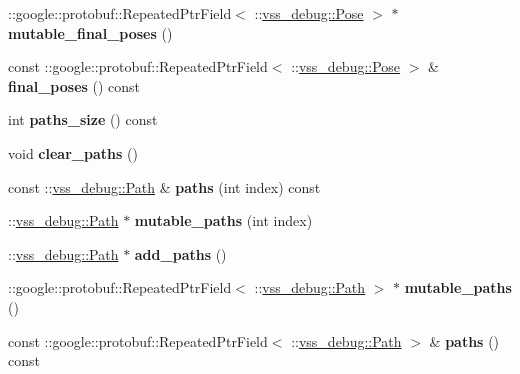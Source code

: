\begin{DoxyCompactItemize}
\item 
\+::google\+::protobuf\+::\+Repeated\+Ptr\+Field$<$ \+::\hyperlink{classvss__debug_1_1Pose}{vss\+\_\+debug\+::\+Pose} $>$ $\ast$ {\bfseries mutable\+\_\+final\+\_\+poses} ()\hypertarget{classvss__debug_1_1Global__Debug_a10edc59958966ab10a17de47665d197b}{}\label{classvss__debug_1_1Global__Debug_a10edc59958966ab10a17de47665d197b}

\item 
const \+::google\+::protobuf\+::\+Repeated\+Ptr\+Field$<$ \+::\hyperlink{classvss__debug_1_1Pose}{vss\+\_\+debug\+::\+Pose} $>$ \& {\bfseries final\+\_\+poses} () const \hypertarget{classvss__debug_1_1Global__Debug_aa6513cf1f4f95e6508b4b5d70858e40a}{}\label{classvss__debug_1_1Global__Debug_aa6513cf1f4f95e6508b4b5d70858e40a}

\item 
int {\bfseries paths\+\_\+size} () const \hypertarget{classvss__debug_1_1Global__Debug_a9c5a48818844b4e19eb33b6773a11b82}{}\label{classvss__debug_1_1Global__Debug_a9c5a48818844b4e19eb33b6773a11b82}

\item 
void {\bfseries clear\+\_\+paths} ()\hypertarget{classvss__debug_1_1Global__Debug_a569afe4a933691714e254ef00fbd2901}{}\label{classvss__debug_1_1Global__Debug_a569afe4a933691714e254ef00fbd2901}

\item 
const \+::\hyperlink{classvss__debug_1_1Path}{vss\+\_\+debug\+::\+Path} \& {\bfseries paths} (int index) const \hypertarget{classvss__debug_1_1Global__Debug_a2e4e41ca6604fb124f4a33ea01d3fb39}{}\label{classvss__debug_1_1Global__Debug_a2e4e41ca6604fb124f4a33ea01d3fb39}

\item 
\+::\hyperlink{classvss__debug_1_1Path}{vss\+\_\+debug\+::\+Path} $\ast$ {\bfseries mutable\+\_\+paths} (int index)\hypertarget{classvss__debug_1_1Global__Debug_aacc3468957863a9d4546f92365608e5a}{}\label{classvss__debug_1_1Global__Debug_aacc3468957863a9d4546f92365608e5a}

\item 
\+::\hyperlink{classvss__debug_1_1Path}{vss\+\_\+debug\+::\+Path} $\ast$ {\bfseries add\+\_\+paths} ()\hypertarget{classvss__debug_1_1Global__Debug_a5d1643503b58fd798e28bc9e7045575f}{}\label{classvss__debug_1_1Global__Debug_a5d1643503b58fd798e28bc9e7045575f}

\item 
\+::google\+::protobuf\+::\+Repeated\+Ptr\+Field$<$ \+::\hyperlink{classvss__debug_1_1Path}{vss\+\_\+debug\+::\+Path} $>$ $\ast$ {\bfseries mutable\+\_\+paths} ()\hypertarget{classvss__debug_1_1Global__Debug_ae5650856b700ed2e9bcee06964925744}{}\label{classvss__debug_1_1Global__Debug_ae5650856b700ed2e9bcee06964925744}

\item 
const \+::google\+::protobuf\+::\+Repeated\+Ptr\+Field$<$ \+::\hyperlink{classvss__debug_1_1Path}{vss\+\_\+debug\+::\+Path} $>$ \& {\bfseries paths} () const \hypertarget{classvss__debug_1_1Global__Debug_ac362c93e8017ad94a1ab54bd7becbc02}{}\label{classvss__debug_1_1Global__Debug_ac362c93e8017ad94a1ab54bd7becbc02}

\end{DoxyCompactItemize}
